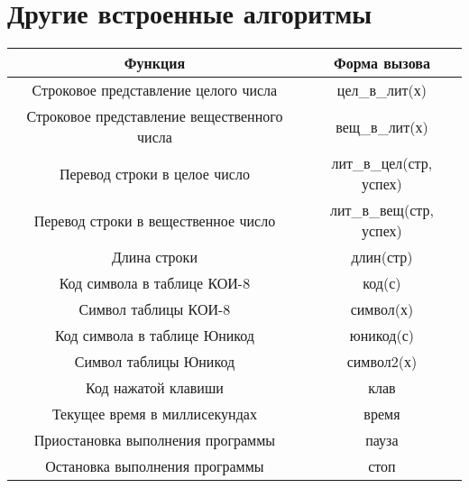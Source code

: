 \section{Другие встроенные алгоритмы}
\begin{center}
\begin{tabular}{||c|c||}
\hline
\hline
\textbf{Функция} &
\textbf{Форма вызова}\\
\hline
\hline
Строковое представление целого числа &
цел\_в\_лит(х)\\
Строковое представление вещественного числа &
вещ\_в\_лит(х)\\
Перевод строки в целое число &
лит\_в\_цел(стр, успех)\\
Перевод строки в вещественное число &
лит\_в\_вещ(стр, успех)\\
\hline
Длина строки &
длин(стр)\\
Код символа в таблице КОИ-8 &
код(с)\\
Символ таблицы КОИ-8 &
символ(х)\\
Код символа в таблице Юникод &
юникод(с)\\
Символ таблицы Юникод &
символ2(х) \\
\hline
Код нажатой клавиши &
клав\\
Текущее время в миллисекундах &
время\\
Приостановка выполнения программы &
пауза\\
Остановка выполнения программы &
стоп\\
\hline
\hline
\end{tabular}
\end{center}
